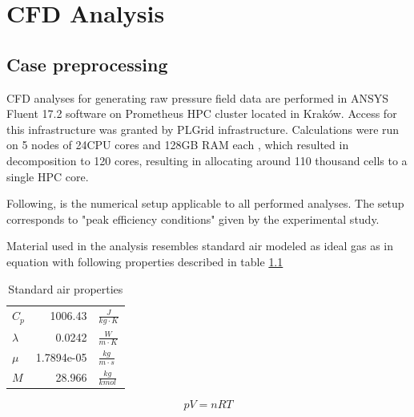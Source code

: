 
\chapter{CFD Analysis} %

\label{cfd} %


\section{Case preprocessing} \label{casepre}

CFD analyses for generating raw pressure field data are performed in ANSYS Fluent 17.2 software on Prometheus HPC cluster located in Kraków. Access for this infrastructure was granted by PLGrid infrastructure. Calculations were run on 5 nodes of 24CPU cores and 128GB RAM each \citep{prometheus}, which resulted in decomposition to 120 cores, resulting in allocating around 110 thousand cells to a single HPC core.

Following, is the numerical setup applicable to all performed analyses. The setup corresponds to "peak efficiency conditions" given by the experimental study.

Material used in the analysis resembles standard air modeled as ideal gas as in equation with following properties described in table \ref{tab:stdair} 

\begin{table}[ht!]
\centering
\caption{Standard air properties} \label{tab:stdair}
\ttfamily
\begin{tabular}{@{}l|rl@{}}
$C_p$ & 1006.43 & $\frac{J}{kg \cdot K}$ \\
$\lambda$ & 0.0242 & $\frac{W}{m \cdot K}$ \\
$\mu$ & 1.7894e-05 & $\frac{kg}{m \cdot s}$ \\
$M$ & 28.966 & $\frac{kg}{kmol}$ \\
\end{tabular}
\end{table}

\begin{equation} \label{eq:stadair}
p V = n R T
\end{equation}

